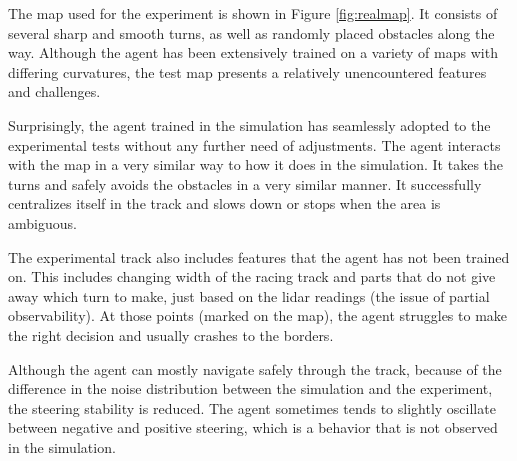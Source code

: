 \documentclass[a4paper, 10pt]{LTJournalArticle}
\begin{document}
The map used for the experiment is shown in Figure \ref{fig:realmap}. It consists of several sharp and smooth turns, as well as randomly placed obstacles along the way. Although the agent has been extensively trained on a variety of maps with differing curvatures, the test map presents a relatively unencountered features and challenges.

Surprisingly, the agent trained in the simulation has seamlessly adopted to the experimental tests without any further need of adjustments. The agent interacts with the map in a very similar way to how it does in the simulation. It takes the turns and safely avoids the obstacles in a very similar manner. It successfully centralizes itself in the track and slows down or stops when the area is ambiguous. 

The experimental track also includes features that the agent has not been trained on. This includes changing width of the racing track and parts that do not give away which turn to make, just based on the lidar readings (the issue of partial observability). At those points (marked on the map), the agent struggles to make the right decision and usually crashes to the borders.

Although the agent can mostly navigate safely through the track, because of the difference in the noise distribution between the simulation and the experiment, the steering stability is reduced. The agent sometimes tends to slightly oscillate between negative and positive steering, which is a behavior that is not observed in the simulation.

\printbibliography %
\end{document}
